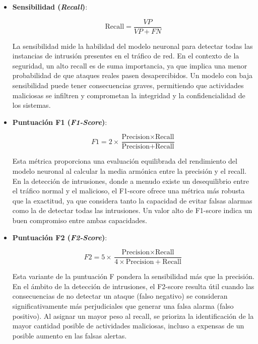 \begin{itemize}
\item \textbf{Sensibilidad (\textit{Recall})}: \label{met:Recall}

\begin{equation}
    \text{Recall} = \frac{VP}{VP + FN}
\end{equation}

La sensibilidad mide la habilidad del modelo neuronal para detectar todas las instancias de intrusión presentes en el tráfico de red. En el contexto de la seguridad, un alto recall es de suma importancia, ya que implica una menor probabilidad de que ataques reales pasen desapercibidos. Un modelo con baja sensibilidad puede tener consecuencias graves, permitiendo que actividades maliciosas se infiltren y comprometan la integridad y la confidencialidad de los sistemas.

\item \textbf{Puntuación F1 (\textit{F1-Score})}: \label{met:F1-score}

\begin{equation}
    F1 = 2 \times \frac{\text{Precision} \times \text{Recall}}{\text{Precision} + \text{Recall}}
\end{equation}

Esta métrica proporciona una evaluación equilibrada del rendimiento del modelo neuronal al calcular la media armónica entre la precisión y el recall. En la detección de intrusiones, donde a menudo existe un desequilibrio entre el tráfico normal y el malicioso, el F1-score ofrece una métrica más robusta que la exactitud, ya que considera tanto la capacidad de evitar falsas alarmas como la de detectar todas las intrusiones. Un valor alto de F1-score indica un buen compromiso entre ambas capacidades.

\item \textbf{Puntuación F2 (\textit{F2-Score})}: \label{met:F2-score}

\begin{equation}
    F2 = 5 \times \frac{\text{Precision} \times \text{Recall}}{4 \times \text{Precision} + \text{Recall}}
\end{equation}

Esta variante de la puntuación F pondera la sensibilidad más que la precisión. En el ámbito de la detección de intrusiones, el F2-score resulta útil cuando las consecuencias de no detectar un ataque (falso negativo) se consideran significativamente más perjudiciales que generar una falsa alarma (falso positivo). Al asignar un mayor peso al recall, se prioriza la identificación de la mayor cantidad posible de actividades maliciosas, incluso a expensas de un posible aumento en las falsas alertas.



\end{itemize}
